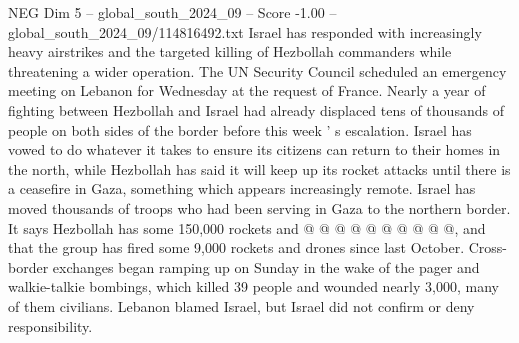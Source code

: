 \begin{textsample}{NEG Dim 5 – global\_south\_2024\_09 – Score -1.00 – global\_south\_2024\_09/114816492.txt}
Israel has responded with increasingly heavy airstrikes and the targeted killing of Hezbollah commanders while threatening a wider operation.
The UN Security Council scheduled an emergency meeting on Lebanon for Wednesday at the request of France.
Nearly a year of fighting between Hezbollah and Israel had already displaced tens of thousands of people on both sides of the border before this week ' s escalation.
Israel has vowed to do whatever it takes to ensure its citizens can return to their homes in the north, while Hezbollah has said it will keep up its rocket attacks until there is a ceasefire in Gaza, something which appears increasingly remote.
Israel has moved thousands of troops who had been serving in Gaza to the northern border.
It says Hezbollah has some 150,000 rockets and @ @ @ @ @ @ @ @ @ @, and that the group has fired some 9,000 rockets and drones since last October.
Cross-border exchanges began ramping up on Sunday in the wake of the pager and walkie-talkie bombings, which killed 39 people and wounded nearly 3,000, many of them civilians.
Lebanon blamed Israel, but Israel did not confirm or deny responsibility.

\end{textsample}
